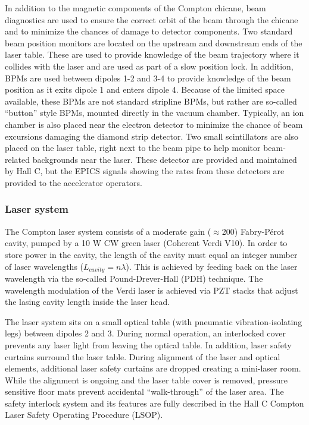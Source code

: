 {In addition to the magnetic components of the Compton chicane, beam diagnostics are used to ensure the
correct orbit of the beam through the chicane and to minimize the chances of damage to detector components.
Two standard beam position monitors are located on the upstream and downstream ends of the laser table. These
are used to provide knowledge of the beam trajectory where it collides with the laser and are used
as part of a slow position lock. In addition, BPMs are used between dipoles 1-2 and 3-4 to provide knowledge
of the beam position as it exits dipole 1 and enters dipole 4. Because of the limited space available,
these BPMs are not standard stripline BPMs, but rather are so-called ``button'' style BPMs, mounted
directly in the vacuum chamber. Typically, an ion chamber is also placed near the electron  detector
to minimize the chance of beam excursions damaging the diamond strip detector. Two small scintillators
are also placed on the laser table, right next to the beam pipe to help monitor beam-related backgrounds
near the laser. These detector are provided and maintained by Hall C, but the EPICS signals showing the rates
from these detectors are provided to the accelerator operators.


\subsubsection{Laser system}
The Compton laser system consists of a moderate gain ($\approx$200) Fabry-P\'{e}rot cavity, pumped by a 10 W
CW green laser (Coherent Verdi V10). In order to store power in the cavity, the length of the cavity must
equal an integer number of laser wavelengths ($L_{cavity}=n\lambda$). This is achieved by feeding back
on the laser wavelength via the so-called Pound-Drever-Hall (PDH) technique. The wavelength modulation
of the Verdi laser is achieved via PZT stacks that adjust the lasing cavity length inside the laser head.

The laser system sits on a small optical table (with pneumatic vibration-isolating legs) between
dipoles 2 and 3. During normal operation, an interlocked cover prevents any laser light from leaving
the optical table. In addition, laser safety curtains surround the laser table. During alignment of
the laser and optical elements, additional laser safety curtains are dropped creating a mini-laser room.
While the alignment is ongoing and the laser table cover is removed, pressure sensitive floor mats prevent
accidental ``walk-through'' of the laser area. The safety interlock system and its features are fully
described in the Hall C Compton Laser Safety Operating Procedure (LSOP). 

}
